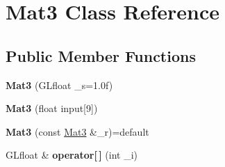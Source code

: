 \hypertarget{classMat3}{\section{Mat3 Class Reference}
\label{classMat3}
}
\subsection*{Public Member Functions}
\begin{DoxyCompactItemize}
\item 
\hypertarget{classMat3_a1c838d121b7a6e27331300469f8795d3}{{\bfseries Mat3} (G\-Lfloat \-\_\-s=1.\-0f)}\label{classMat3_a1c838d121b7a6e27331300469f8795d3}

\item 
\hypertarget{classMat3_a381984595fe8f9e98320849b363dbfc8}{{\bfseries Mat3} (float input\mbox{[}9\mbox{]})}\label{classMat3_a381984595fe8f9e98320849b363dbfc8}

\item 
\hypertarget{classMat3_a2bd1561f8f715029717e21110644db27}{{\bfseries Mat3} (const \hyperlink{classMat3}{Mat3} \&\-\_\-r)=default}\label{classMat3_a2bd1561f8f715029717e21110644db27}

\item 
\hypertarget{classMat3_a7dbff599f892535bd1354b5e704e9269}{G\-Lfloat \& {\bfseries operator\mbox{[}$\,$\mbox{]}} (int \-\_\-i)}\label{classMat3_a7dbff599f892535bd1354b5e704e9269}

\end{DoxyCompactItemize}
